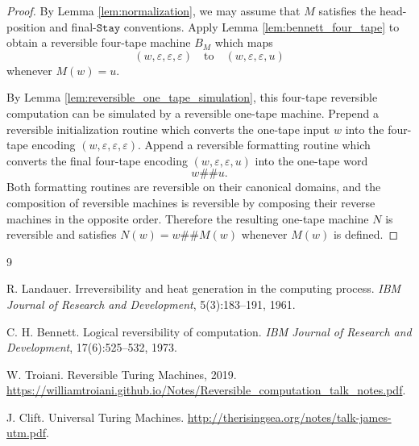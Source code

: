 \documentclass[12pt]{article}
\theoremstyle{plain}
\theoremstyle{definition}
\begin{document}
\begin{proof}
By Lemma \ref{lem:normalization}, we may assume that $M$ satisfies the head-position and final-$\texttt{Stay}$ conventions. Apply Lemma \ref{lem:bennett_four_tape} to obtain a reversible four-tape machine $B_M$ which maps
\[
(w,\varepsilon,\varepsilon,\varepsilon)
\quad\text{to}\quad
(w,\varepsilon,\varepsilon,u)
\]
whenever $M(w)=u$.

By Lemma \ref{lem:reversible_one_tape_simulation}, this four-tape reversible computation can be simulated by a reversible one-tape machine. Prepend a reversible initialization routine which converts the one-tape input $w$ into the four-tape encoding $(w,\varepsilon,\varepsilon,\varepsilon)$. Append a reversible formatting routine which converts the final four-tape encoding $(w,\varepsilon,\varepsilon,u)$ into the one-tape word
\[
w\#\#u.
\]
Both formatting routines are reversible on their canonical domains, and the composition of reversible machines is reversible by composing their reverse machines in the opposite order. Therefore the resulting one-tape machine $N$ is reversible and satisfies $N(w)=w\#\#M(w)$ whenever $M(w)$ is defined.
\end{proof}

\begin{thebibliography}{9}

R. Landauer.
\newblock Irreversibility and heat generation in the computing process.
\newblock \emph{IBM Journal of Research and Development}, 5(3):183--191, 1961.

C. H. Bennett.
\newblock Logical reversibility of computation.
\newblock \emph{IBM Journal of Research and Development}, 17(6):525--532, 1973.

W. Troiani.
\newblock Reversible Turing Machines, 2019.
\newblock \url{https://williamtroiani.github.io/Notes/Reversible_computation_talk_notes.pdf}.

J. Clift.
\newblock Universal Turing Machines.
\newblock \url{http://therisingsea.org/notes/talk-james-utm.pdf}.

\end{thebibliography}
\end{document}
